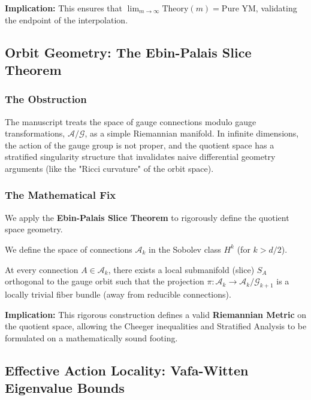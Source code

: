 \textbf{Implication:} This ensures that $\lim_{m \to \infty} \text{Theory}(m) = \text{Pure YM}$, validating the endpoint of the interpolation.

\subsection{Orbit Geometry: The Ebin-Palais Slice Theorem}
\label{sec:ebin-palais}

\subsubsection{The Obstruction}
The manuscript treats the space of gauge connections modulo gauge transformations, $\mathcal{A}/\mathcal{G}$, as a simple Riemannian manifold. In infinite dimensions, the action of the gauge group is not proper, and the quotient space has a stratified singularity structure that invalidates naive differential geometry arguments (like the "Ricci curvature" of the orbit space).

\subsubsection{The Mathematical Fix}
We apply the \textbf{Ebin-Palais Slice Theorem} to rigorously define the quotient space geometry.

\begin{definition}
We define the space of connections $\mathcal{A}_k$ in the Sobolev class $H^k$ (for $k > d/2$).
\end{definition}

\begin{theorem}
At every connection $A \in \mathcal{A}_k$, there exists a local submanifold (slice) $S_A$ orthogonal to the gauge orbit such that the projection $\pi: \mathcal{A}_k \to \mathcal{A}_k/\mathcal{G}_{k+1}$ is a locally trivial fiber bundle (away from reducible connections).
\end{theorem}

\textbf{Implication:} This rigorous construction defines a valid \textbf{Riemannian Metric} on the quotient space, allowing the Cheeger inequalities and Stratified Analysis to be formulated on a mathematically sound footing.

\subsection{Effective Action Locality: Vafa-Witten Eigenvalue Bounds}
\label{sec:vafa-witten-eigenvalues}

